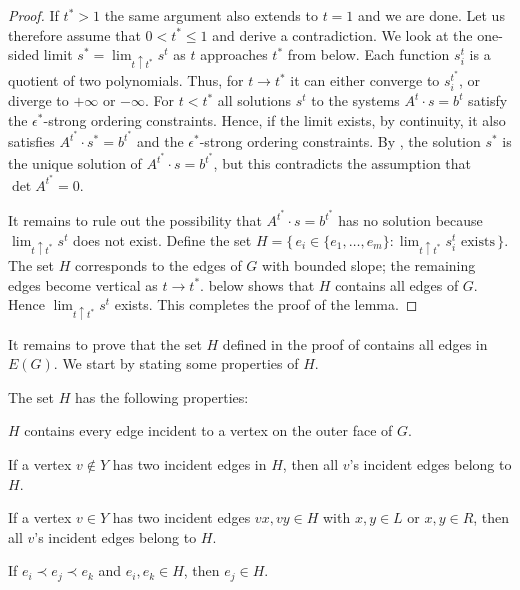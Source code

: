 \begin{proof}
	If $t^*>1$ the same argument also extends to $t=1$ and we are done.
	Let us therefore assume that $0<t^*\le 1$ and derive a contradiction.
	We look at the one-sided limit $s^*=\lim_{t\uparrow t^*}
	s^t$
as $t$ approaches $t^*$ from below.
	Each function $s_i^t$ is a quotient of two polynomials.
	Thus, for $t\to t^*$ it can either converge to $s_i^{t^*}$, or diverge to $+\infty$ or $-\infty$.
	For $t<t^*$ all solutions $s^t$ to the systems $A^t\cdot s=b^t$ satisfy the $\epsilon^*$-strong ordering constraints.
	Hence, if the limit exists, by continuity, it also satisfies $A^{t^*}\cdot s^*=b^{t^*}$
	and the $\epsilon^*$-strong ordering constraints.
	By , the solution $s^*$ is
	the unique solution
	of $A^{t^*}\cdot s=b^{t^*}$, but this contradicts the assumption
	that $\det A^{t^*}= 0$.
	
	It remains to rule out the possibility that
	$A^{t^*}\cdot s=b^{t^*}$ has no solution because
	$\lim_{t\uparrow t^*} s^t$ does not exist.  Define the set $H=\{\,e_i\in
	\{e_1,\ldots,e_m\}:\text{$\lim_{t\uparrow t^*} s_i^t$ exists}\,\}$.
	The set $H$ corresponds to the edges of $G$
	with bounded slope; the remaining edges become vertical as $t\to t^*$.
	 below shows that $H$ contains all edges of $G$. Hence $\lim_{t\uparrow t^*} s^t$ exists. This completes the proof of the lemma.
\end{proof}


It remains to prove that the set $H$ defined in the proof of  contains all edges in $E(G)$. We start by stating some properties of $H$.

	\begin{prop}
		The set   $H$ has the following properties: 
		\begin{compactenum}[(PR1)]
			\item $H$ contains every edge incident to a vertex on the outer face of $G$.
			\item \label{off-C}
			If a vertex $v\not\in Y$ has two incident edges in
			$H$,
			then all $v$'s incident edges belong to $H$.
			\item \label{on-C}
			If a vertex $v\in Y$ has two incident edges $vx,vy\in H$ with $x,y\in L$ or $x,y\in R$, then all $v$'s incident edges belong to $H$.
			\item If $e_i \prec e_j \prec e_k$ and $e_i,e_k\in H$, 
			then $e_j\in H$.
		\end{compactenum}
	\end{prop}
		
